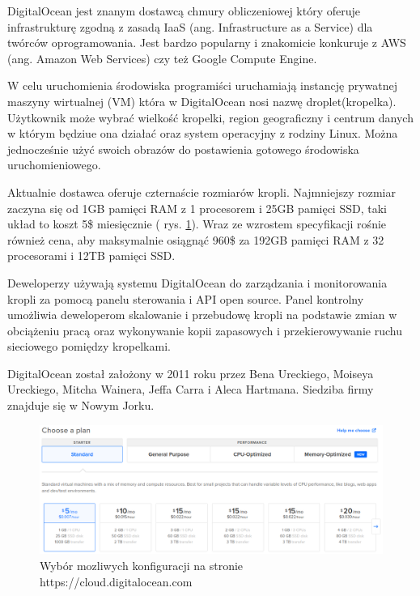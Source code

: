 

DigitalOcean jest znanym dostawcą chmury obliczeniowej który oferuje infrastrukturę zgodną z zasadą IaaS (ang. Infrastructure as a Service) dla twórców oprogramowania. Jest bardzo popularny i znakomicie konkuruje z AWS (ang. Amazon Web Services) czy też Google Compute Engine.

W celu uruchomienia środowiska programiści uruchamiają instancję prywatnej maszyny wirtualnej (VM) która w DigitalOcean nosi nazwę droplet(kropelka). Użytkownik może wybrać wielkość kropelki, region geograficzny i centrum danych w którym będziue ona działać oraz system operacyjny z rodziny Linux.
Można jednocześnie użyć swoich obrazów do postawienia gotowego środowiska uruchomieniowego.

Aktualnie dostawca oferuje czternaście rozmiarów kropli. Najmniejszy rozmiar zaczyna się od 1GB pamięci RAM z 1 procesorem i 25GB pamięci SSD, taki układ to koszt 5\$ miesięcznie ( rys. \ref{fig:digitalocean}). Wraz ze wzrostem specyfikacji rośnie również cena, aby maksymalnie osiągnąć 960\$ za 192GB pamięci RAM z 32 procesorami i 12TB pamięci SSD.

Deweloperzy używają systemu DigitalOcean do zarządzania i monitorowania kropli za pomocą panelu sterowania i API open source. Panel kontrolny umożliwia deweloperom skalowanie i przebudowę kropli na podstawie zmian w obciążeniu pracą oraz wykonywanie kopii zapasowych i przekierowywanie ruchu sieciowego pomiędzy kropelkami.

DigitalOcean został założony w 2011 roku przez Bena Ureckiego, Moiseya Ureckiego, Mitcha Wainera, Jeffa Carra i Aleca Hartmana. Siedziba firmy znajduje się w Nowym Jorku.


\begin{figure}[H]
    \centering
    \includegraphics[width=6in]{images/digitalocean.png}
    \caption{Wybór mozliwych konfiguracji na stronie https://cloud.digitalocean.com \label{fig:digitalocean}}
\end{figure}